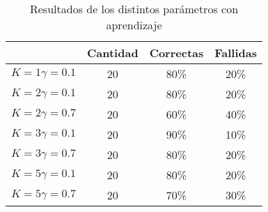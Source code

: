 \begin{table}
\centering
\begin{tabular}{c c c c}
\hline 
& Cantidad & Correctas & Fallidas \\ 
\hline 
$K = 1  \gamma = 0.1$ & 20 & 80\% & 20\% \\ 
$K = 2  \gamma = 0.1$ & 20 & 80\% & 20\% \\ 
$K = 2  \gamma = 0.7$ & 20 & 60\% & 40\% \\ 
$K = 3  \gamma = 0.1$ & 20 & 90\% & 10\% \\ 
$K = 3  \gamma = 0.7$ & 20 & 80\% & 20\% \\ 
$K = 5  \gamma = 0.1$ & 20 & 80\% & 20\% \\ 
$K = 5  \gamma = 0.7$ & 20 & 70\% & 30\% \\ 
\hline 

\end{tabular} 

\caption{Resultados de los distintos par\'ametros con aprendizaje}
\label{tabla:entramientos}


\end{table}
%
%
%
%
